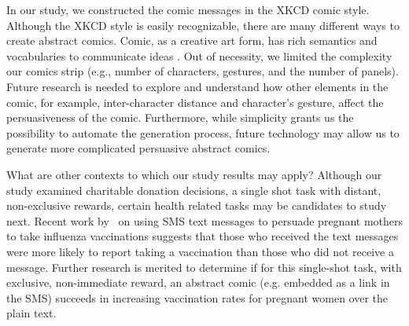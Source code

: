 \begin{description}[leftmargin=\parindent,topsep=0pt,partopsep=3pt,parsep=0pt,itemsep=3pt, listparindent=\parindent]
  \item[Comic Message Construction:] In our study, we constructed the comic messages in the XKCD comic style. Although the XKCD style is easily recognizable, there are many different ways to create abstract comics.  Comic, as a creative art form, has rich semantics and vocabularies to communicate ideas \cite{scott1993understanding}. Out of necessity, we limited the complexity our comics strip (e.g., number of characters, gestures, and the number of panels). Future research is needed to explore and understand how other elements in the comic, for example, inter-character distance and character's gesture, affect the persuasiveness of the comic. Furthermore, while simplicity grants us the possibility to automate the generation process, future technology may allow us to generate more complicated persuasive abstract comics.
  
    \item[Other Experimental Contexts:] What are other contexts to which our study results may apply? Although our study examined charitable donation decisions, a single shot task with distant, non-exclusive rewards, certain health related tasks may be candidates to study next. Recent work by~\textcite{Bushar2017} on using SMS text messages to persuade pregnant mothers to take influenza vaccinations suggests that those who received the text messages were more likely to report taking a vaccination than those who did not receive a message. Further research is merited to determine if for this single-shot task, with exclusive, non-immediate reward, an abstract comic (e.g. embedded as a link in the SMS) succeeds in increasing vaccination rates for pregnant women over the plain text.
  
\end{description}


